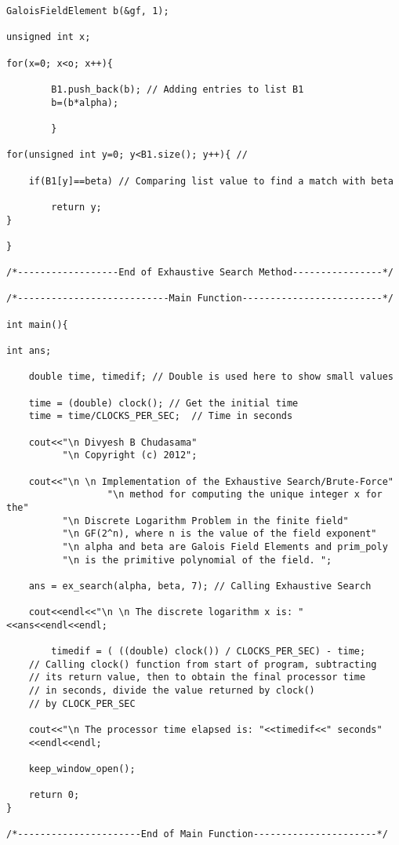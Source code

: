 \documentclass[iwp,first]{luthesis}
\begin{document}
\begin{verbatim}
GaloisFieldElement b(&gf, 1);

unsigned int x;

for(x=0; x<o; x++){

        B1.push_back(b); // Adding entries to list B1
        b=(b*alpha);

        }

for(unsigned int y=0; y<B1.size(); y++){ //

    if(B1[y]==beta) // Comparing list value to find a match with beta

        return y;
}

}

/*------------------End of Exhaustive Search Method----------------*/

/*---------------------------Main Function-------------------------*/

int main(){

int ans;

	double time, timedif; // Double is used here to show small values

    time = (double) clock(); // Get the initial time
    time = time/CLOCKS_PER_SEC;  // Time in seconds 
    
    cout<<"\n Divyesh B Chudasama"
          "\n Copyright (c) 2012";
	
    cout<<"\n \n Implementation of the Exhaustive Search/Brute-Force" 
		          "\n method for computing the unique integer x for the" 
          "\n Discrete Logarithm Problem in the finite field" 
          "\n GF(2^n), where n is the value of the field exponent" 
          "\n alpha and beta are Galois Field Elements and prim_poly 
          "\n is the primitive polynomial of the field. ";

    ans = ex_search(alpha, beta, 7); // Calling Exhaustive Search

    cout<<endl<<"\n \n The discrete logarithm x is: "<<ans<<endl<<endl;

	    timedif = ( ((double) clock()) / CLOCKS_PER_SEC) - time; 
    // Calling clock() function from start of program, subtracting 
    // its return value, then to obtain the final processor time 
    // in seconds, divide the value returned by clock() 
    // by CLOCK_PER_SEC
    
    cout<<"\n The processor time elapsed is: "<<timedif<<" seconds"
    <<endl<<endl;
  
	keep_window_open();

    return 0;
} 

/*----------------------End of Main Function----------------------*/

\end{verbatim}
\end{document}
